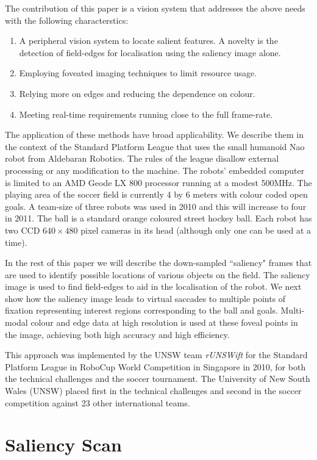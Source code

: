\documentclass[runningheads,a4paper]{llncs}
\begin{document}
The contribution of this paper is a vision system that addresses the above needs with the following characterstics:
\begin{enumerate}
\item A peripheral vision system to locate salient features. A novelty is the detection of field-edges for localisation using the saliency image alone.   
\item Employing foveated imaging techniques to limit resource usage.
\item Relying more on edges and reducing the dependence on colour.
\item Meeting real-time requirements running close to the full frame-rate.
\end{enumerate}

The application of these methods have broad applicability. We describe them in
the context of the Standard Platform League that uses the small humanoid Nao
robot from Aldebaran Robotics. The rules of the league disallow external
processing or any modification to the machine. The robots' embedded computer is
limited to an AMD Geode LX 800 processor running at a modest 500MHz. The playing
area of the soccer field is currently 4 by 6 meters with colour coded open
goals. A team-size of three robots was used in 2010 and this will increase to
four in 2011. The ball is a standard orange coloured street hockey ball. Each
robot has two CCD $640 \times 480$ pixel cameras in its head (although only one
can be used at a time).  

In the rest of this paper we will describe the down-sampled ``saliency" frames
that are used to identify possible locations of various objects on the field.
The saliency image is used to find field-edges to aid in the localisation of
the robot. We next show how the saliency image leads to virtual saccades to
multiple points of fixation representing interest regions corresponding to the
ball and goals. Multi-modal colour and edge data at high resolution is used at
these foveal points in the image, achieving both high accuracy and high
efficiency. 

This approach was implemented by the UNSW team \emph{rUNSWift} for the Standard Platform League in  RoboCup World Competition in Singapore in 2010, for both the technical challenges and the soccer tournament. The University of New South Wales (UNSW) placed first in the technical challenges and second in the soccer competition against 23 other international teams.

\section{Saliency Scan}
\end{document}
